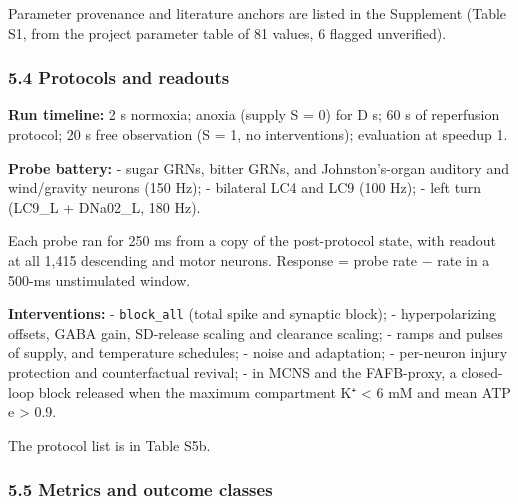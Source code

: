 \documentclass[11pt]{article}
\begin{document}
Parameter provenance and literature anchors are listed in the Supplement (Table S1, from the project parameter table of 81 values, 6 flagged unverified).

\subsubsection{5.4 Protocols and readouts}\label{protocols-and-readouts}

\textbf{Run timeline:} 2 s normoxia; anoxia (supply S = 0) for D s; 60 s of reperfusion protocol; 20 s free observation (S = 1, no interventions); evaluation at speedup 1.

\textbf{Probe battery:}
- sugar GRNs, bitter GRNs, and Johnston's-organ auditory and wind/gravity neurons (150 Hz);
- bilateral LC4 and LC9 (100 Hz);
- left turn (LC9\_L + DNa02\_L, 180 Hz).

Each probe ran for 250 ms from a copy of the post-protocol state, with readout at all 1,415 descending and motor neurons. Response = probe rate − rate in a 500-ms unstimulated window.

\textbf{Interventions:}
- \texttt{block\_all} (total spike and synaptic block);
- hyperpolarizing offsets, GABA gain, SD-release scaling and clearance scaling;
- ramps and pulses of supply, and temperature schedules;
- noise and adaptation;
- per-neuron injury protection and counterfactual revival;
- in MCNS and the FAFB-proxy, a closed-loop block released when the maximum compartment K⁺ \textless{} 6 mM and mean ATP e \textgreater{} 0.9.

The protocol list is in Table S5b.

\subsubsection{5.5 Metrics and outcome classes}\label{metrics-and-outcome-classes}
\end{document}
